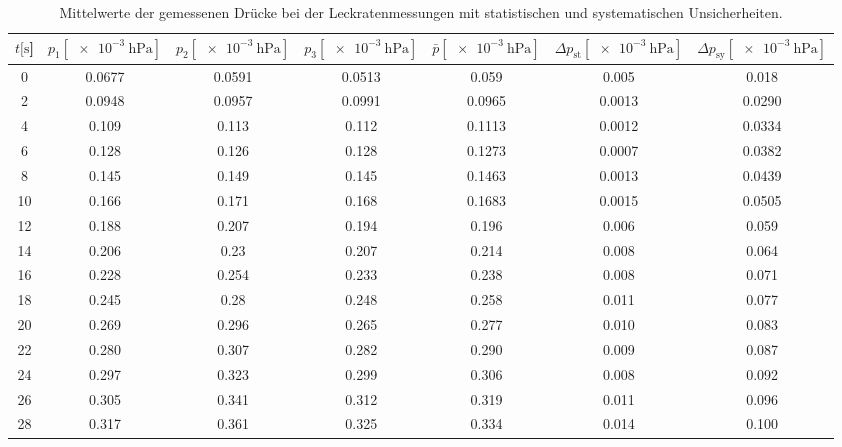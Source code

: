 \begin{table}[H]
    \centering
      \caption{Mittelwerte der gemessenen Drücke bei der Leckratenmessungen mit statistischen und systematischen Unsicherheiten.}
      \label{tab:Turbo_Leck1}
      \small{
      \begin{tabular}{
        S[table-format=3.0] 
        S[table-format=1.4] S[table-format=1.4] S[table-format=1.4]
        S[table-format=1.4] S[table-format=1.4] S[table-format=1.3]
        }
        \toprule
        {$t [\si{\second}$]} &
        {$p_1 [\SI{e-3}{\hecto\pascal}]$} & {$p_2 [\SI{e-3}{\hecto\pascal}]$} & {$p_3 [\SI{e-3}{\hecto\pascal}]$} &
        {$\bar{p} [\SI{e-3}{\hecto\pascal}]$} & {$\Delta p_\text{st} [\SI{e-3}{\hecto\pascal}]$} & {$\Delta p_\text{sy} [\SI{e-3}{\hecto\pascal}]$}\\
            & 0.0677 & 0.0591 & 0.0513 & 0.059  & 0.005  & 0.018  \\
        2    & 0.0948 & 0.0957 & 0.0991 & 0.0965 & 0.0013 & 0.0290 \\
        4    & 0.109  & 0.113  & 0.112  & 0.1113 & 0.0012 & 0.0334 \\
        6    & 0.128  & 0.126  & 0.128  & 0.1273 & 0.0007 & 0.0382 \\
        8    & 0.145  & 0.149  & 0.145  & 0.1463 & 0.0013 & 0.0439 \\
        10   & 0.166  & 0.171  & 0.168  & 0.1683 & 0.0015 & 0.0505 \\
        12   & 0.188  & 0.207  & 0.194  & 0.196  & 0.006  & 0.059  \\
        14   & 0.206  & 0.23   & 0.207  & 0.214  & 0.008  & 0.064  \\
        16   & 0.228  & 0.254  & 0.233  & 0.238  & 0.008  & 0.071  \\
        18   & 0.245  & 0.28   & 0.248  & 0.258  & 0.011  & 0.077  \\
        20   & 0.269  & 0.296  & 0.265  & 0.277  & 0.010  & 0.083  \\
        22   & 0.280  & 0.307  & 0.282  & 0.290  & 0.009  & 0.087  \\
        24   & 0.297  & 0.323  & 0.299  & 0.306  & 0.008  & 0.092  \\
        26   & 0.305  & 0.341  & 0.312  & 0.319  & 0.011  & 0.096  \\
        28   & 0.317  & 0.361  & 0.325  & 0.334  & 0.014  & 0.100  \\

\end{tabular}}
\end{table}

